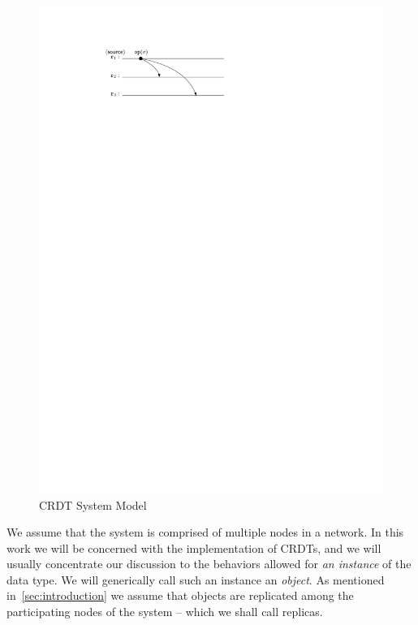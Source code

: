 \begin{figure}
  \centering
  \includegraphics[scale=.9]{figures/sys-mod}
  \caption{CRDT System Model}
  \label{fig:sys-mod}
\end{figure}
We assume that the system is comprised of multiple nodes in a network.
In this work we will be concerned with the implementation of CRDTs,
and we will usually concentrate our discussion to the behaviors
allowed for \emph{an instance} of the data type.
We will generically call such an instance an \emph{object}.
As mentioned in~\autoref{sec:introduction} we assume that objects are
replicated among the participating nodes of the system -- which we
shall call replicas.

